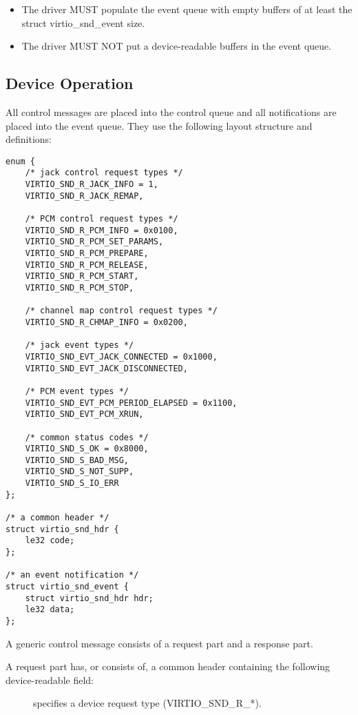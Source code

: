 \begin{itemize}
\item The driver MUST populate the event queue with empty buffers of at least
the struct virtio_snd_event size.
\item The driver MUST NOT put a device-readable buffers in the event queue.
\end{itemize}

\subsection{Device Operation}\label{sec:Device Types / Sound Device / Device Operation}

All control messages are placed into the control queue and all notifications
are placed into the event queue. They use the following layout structure and
definitions:

\begin{lstlisting}
enum {
    /* jack control request types */
    VIRTIO_SND_R_JACK_INFO = 1,
    VIRTIO_SND_R_JACK_REMAP,

    /* PCM control request types */
    VIRTIO_SND_R_PCM_INFO = 0x0100,
    VIRTIO_SND_R_PCM_SET_PARAMS,
    VIRTIO_SND_R_PCM_PREPARE,
    VIRTIO_SND_R_PCM_RELEASE,
    VIRTIO_SND_R_PCM_START,
    VIRTIO_SND_R_PCM_STOP,

    /* channel map control request types */
    VIRTIO_SND_R_CHMAP_INFO = 0x0200,

    /* jack event types */
    VIRTIO_SND_EVT_JACK_CONNECTED = 0x1000,
    VIRTIO_SND_EVT_JACK_DISCONNECTED,

    /* PCM event types */
    VIRTIO_SND_EVT_PCM_PERIOD_ELAPSED = 0x1100,
    VIRTIO_SND_EVT_PCM_XRUN,

    /* common status codes */
    VIRTIO_SND_S_OK = 0x8000,
    VIRTIO_SND_S_BAD_MSG,
    VIRTIO_SND_S_NOT_SUPP,
    VIRTIO_SND_S_IO_ERR
};

/* a common header */
struct virtio_snd_hdr {
    le32 code;
};

/* an event notification */
struct virtio_snd_event {
    struct virtio_snd_hdr hdr;
    le32 data;
};
\end{lstlisting}

A generic control message consists of a request part and a response part.

A request part has, or consists of, a common header containing the following
device-readable field:

\begin{description}
\item[] specifies a device request type (VIRTIO_SND_R_*).
\end{description}

